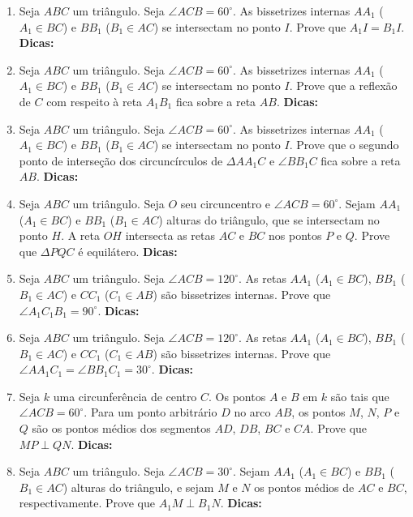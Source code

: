 \documentclass{article}
\newcommand{\dica}{\textbf{Dicas:}}
\newcommand{\iniTri}{Seja $ABC$ um triângulo}
\begin{document}
\begin{multicols}{2}
\begin{enumerate}
    \item \iniTri. Seja $\angle ACB=60^{\circ}$. As bissetrizes internas $AA_1$ ($A_1\in BC$) e $BB_1$ ($B_1\in AC$) se intersectam no ponto $I$. Prove que $A_1I=B_1I$. \dica %
    
    \item \iniTri. Seja $\angle ACB=60^{\circ}$. As bissetrizes internas $AA_1$ ($A_1\in BC$) e $BB_1$ ($B_1\in AC$) se intersectam no ponto $I$. Prove que a reflexão de $C$ com respeito à reta $A_1B_1$ fica sobre a reta $AB$. \dica %
    
    \item \iniTri. Seja $\angle ACB=60^{\circ}$. As bissetrizes internas $AA_1$ ($A_1\in BC$) e $BB_1$ ($B_1\in AC$) se intersectam no ponto $I$. Prove que o segundo ponto de interseção dos circuncírculos de $\Delta AA_1C$ e $\angle BB_1C$ fica sobre a reta $AB$. \dica %
    
    \item \iniTri. Seja $O$ seu circuncentro e $\angle ACB=60^{\circ}$. Sejam $AA_1$ ($A_1\in BC$) e $BB_1$ ($B_1\in AC$) alturas do triângulo, que se intersectam no ponto $H$. A reta $OH$ intersecta as retas $AC$ e $BC$ nos pontos $P$ e $Q$. Prove que $\Delta PQC$ é equilátero. \dica %
    
    \item \iniTri. Seja $\angle ACB=120^{\circ}$. As retas $AA_1$ ($A_1\in BC$), $BB_1$ ($B_1\in AC$) e $CC_1$ ($C_1\in AB$) são bissetrizes internas. Prove que $\angle A_1C_1B_1=90^{\circ}$. \dica %
    
    \item \iniTri. Seja $\angle ACB=120^{\circ}$. As retas $AA_1$ ($A_1\in BC$), $BB_1$ ($B_1\in AC$) e $CC_1$ ($C_1\in AB$) são bissetrizes internas. Prove que $\angle AA_1C_1=\angle BB_1C_1=30^{\circ}$. \dica %
    
    \item Seja $k$ uma circunferência de centro $C$. Os pontos $A$ e $B$ em $k$ são tais que $\angle ACB=60^{\circ}$. Para um ponto arbitrário $D$ no arco $AB$, os pontos $M$, $N$, $P$ e $Q$ são os pontos médios dos segmentos $AD$, $DB$, $BC$ e $CA$. Prove que $MP\perp QN$. \dica %
    
    \item \iniTri. Seja $\angle ACB=30^{\circ}$. Sejam $AA_1$ ($A_1\in BC$) e $BB_1$ ($B_1\in AC$) alturas do triângulo, e sejam $M$ e $N$ os pontos médios de $AC$ e $BC$, respectivamente. Prove que $A_1M\perp B_1N$. \dica %
    

\end{enumerate}
\end{multicols}
\end{document}
